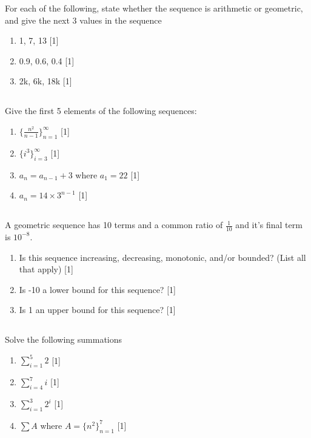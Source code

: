 \documentclass[twocolumn]{article}
\newcounter{pmarks}
\newcounter{marks}
\newcommand\mrk[1]{{\hfill\color{blue}\small[{#1}]}\addtocounter{pmarks}{#1}\addtocounter{marks}{#1}}
\begin{document}
    For each of the following, state whether the sequence is arithmetic or geometric, and give the next 3 values in the sequence

    \begin{enumerate}
        \item 1, 7, 13 \mrk{1}
        \item 0.9, 0.6, 0.4 \mrk{1}
        \item 2k, 6k, 18k \mrk{1}
    \end{enumerate}

\subsection{}

    Give the first 5 elements of the following sequences:

    \begin{enumerate}
        \item $ \{ \frac{n^2}{n-1} \}^\infty_{n=1} $ \mrk{1}
        \item $ \{ i^3 \}^\infty_{i=3} $ \mrk{1}
        \item $ a_n = a_{n-1} + 3 $ where $a_1 = 22$ \mrk{1}
        \item $ a_n = 14 \times 3^{n-1} $ \mrk{1}
    \end{enumerate}

\subsection{}

    A geometric sequence has 10 terms and a common ratio of $\frac{1}{10}$ and it's final term is ${10^{-8}}$.

    \begin{enumerate}
        \item Is this sequence increasing, decreasing, monotonic, and/or bounded? (List all that apply) \mrk{1}
        \item Is -10 a lower bound for this sequence? \mrk{1}
        \item Is 1 an upper bound for this sequence? \mrk{1}
    \end{enumerate}

\subsection{}

    Solve the following summations

    \begin{enumerate}
        \item $ \sum_{i=1}^{5} 2 $ \mrk{1}
        \item $ \sum_{i=4}^{7} i $ \mrk{1}
        \item $ \sum_{i=1}^{3} 2^i $ \mrk{1}
        \item $ \sum A $ where $ A = \{ n^2 \}^{7}_{n=1} $ \mrk{1}
    \end{enumerate}
\end{document}

